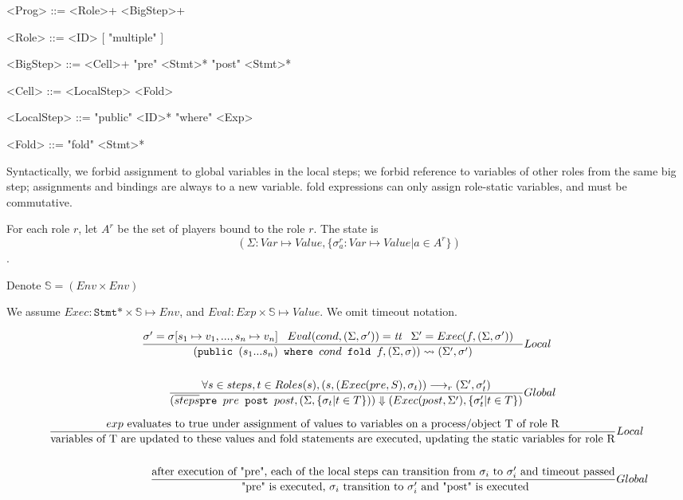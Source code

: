\documentclass[acmsmall,review,anonymous]{acmart}\settopmatter{printfolios=true}
\begin{document}
\begin{grammar}
	<Prog>      ::= <Role>+ <BigStep>+

	<Role>		::= <ID> [ "multiple" ]

	<BigStep>   ::= <Cell>+ "pre" <Stmt>* "post" <Stmt>*

	<Cell> 		::= <LocalStep> <Fold>

	<LocalStep> ::= "public" <ID>* "where" <Exp>
	
	<Fold>      ::= "fold" <Stmt>*
\end{grammar}

Syntactically, we forbid assignment to global variables in the local steps;
we forbid reference to variables of other roles from the same big step;
assignments and bindings are always to a new variable.
fold expressions can only assign role-static variables, and must be commutative.

For each role $r$, let $A^r$ be the set of players bound to the role $r$.
The state is 
\[
	(\Sigma: Var \mapsto Value, \{ \sigma^r_a: Var \mapsto Value | a \in A^r \} )
\].

Denote $\mathbb{S} = (Env \times Env)$

We assume $Exec: \texttt{Stmt*} \times \mathbb{S} \mapsto Env $, and $Eval: Exp \times \mathbb{S} \mapsto Value$.
We omit timeout notation.

\begin{align*}
	\judge{&Local}{
		\sigma' = \sigma[s_1\mapsto v_1, ..., s_n \mapsto v_n] \;\;\;
		Eval(cond, (\Sigma, \sigma')) = \emph{tt} \;\;\;
		\Sigma' = Exec(f, (\Sigma, \sigma')) \;\;\;
	}{
		(\texttt{public }(s_1 ... s_n) \texttt{ where } cond\texttt{ fold }f, (\Sigma, \sigma)) \rightsquigarrow (\Sigma', \sigma')
	}\\
	\\
	\judge{&Global}{
		\forall s\in steps, t\in Roles(s), (s, (Exec(pre, S), \sigma_t)) \longrightarrow_r (\Sigma', \sigma'_t)
	}{ %
		(\overline{steps} \texttt{pre } pre \texttt{ post } post, (\Sigma, \{\sigma_t | t \in T \}))
		\Downarrow (Exec(post, \Sigma'), \{\sigma'_t | t\in T \})
	}
\end{align*}

\vfill 
\pagebreak

\begin{align*}
	\judge{&Local}{
		exp \text{ evaluates to true under assignment of values to variables on a process/object T of role R}
	}{
		\text{variables of T are updated to these values and fold statements are executed, updating the static variables for role R}
	}\\
	\\
	\judge{&Global}{
		\text{after execution of "pre", each of the local steps can transition from }
		\sigma_i \text{ to } \sigma'_i \text{ and timeout passed}
	}{
		\text{ "pre" is executed, } \sigma_i \text{ transition to } \sigma'_i \text{ and "post" is executed}
	}
\end{align*}
\end{document}
